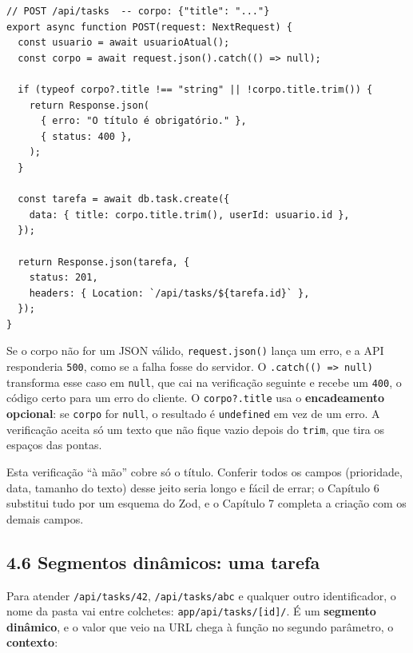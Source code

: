 \begin{codigo}
\begin{Verbatim}[breaklines=true, breaksymbolleft={}, fontsize=\footnotesize]
// POST /api/tasks  -- corpo: {"title": "..."}
export async function POST(request: NextRequest) {
  const usuario = await usuarioAtual();
  const corpo = await request.json().catch(() => null);

  if (typeof corpo?.title !== "string" || !corpo.title.trim()) {
    return Response.json(
      { erro: "O título é obrigatório." },
      { status: 400 },
    );
  }

  const tarefa = await db.task.create({
    data: { title: corpo.title.trim(), userId: usuario.id },
  });

  return Response.json(tarefa, {
    status: 201,
    headers: { Location: `/api/tasks/${tarefa.id}` },
  });
}
\end{Verbatim}
\end{codigo}

Se o corpo não for um JSON válido, \texttt{request.json()} lança um erro, e a API responderia \texttt{500}, como se a falha fosse do servidor. O \texttt{.catch(() => null)} transforma esse caso em \texttt{null}, que cai na verificação seguinte e recebe um \texttt{400}, o código certo para um erro do cliente. O \texttt{corpo?.title} usa o \textbf{encadeamento opcional}: se \texttt{corpo} for \texttt{null}, o resultado é \texttt{undefined} em vez de um erro. A verificação aceita só um texto que não fique vazio depois do \texttt{trim}, que tira os espaços das pontas.

Esta verificação ``à mão'' cobre só o título. Conferir todos os campos (prioridade, data, tamanho do texto) desse jeito seria longo e fácil de errar; o Capítulo 6 substitui tudo por um esquema do Zod, e o Capítulo 7 completa a criação com os demais campos.

\subsection{4.6 Segmentos dinâmicos: uma tarefa}

Para atender \texttt{/api/tasks/42}, \texttt{/api/tasks/abc} e qualquer outro identificador, o nome da pasta vai entre colchetes: \texttt{app/api/tasks/[id]/}. É um \textbf{segmento dinâmico}, e o valor que veio na URL chega à função no segundo parâmetro, o \textbf{contexto}:

